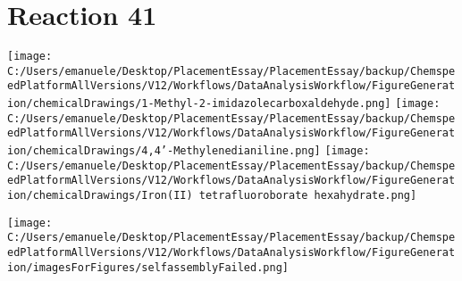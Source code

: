 \documentclass{article}%
\begin{document}
\section*{Reaction 41}%
%
\begin{scheme}[H]%
\begin{minipage}{0.5\textwidth}%
\texttt{[image: C:/Users/emanuele/Desktop/PlacementEssay/PlacementEssay/backup/ChemspeedPlatformAllVersions/V12/Workflows/DataAnalysisWorkflow/FigureGeneration/chemicalDrawings/1-Methyl-2-imidazolecarboxaldehyde.png]}%
\texttt{[image: C:/Users/emanuele/Desktop/PlacementEssay/PlacementEssay/backup/ChemspeedPlatformAllVersions/V12/Workflows/DataAnalysisWorkflow/FigureGeneration/chemicalDrawings/4,4'-Methylenedianiline.png]}%
\texttt{[image: C:/Users/emanuele/Desktop/PlacementEssay/PlacementEssay/backup/ChemspeedPlatformAllVersions/V12/Workflows/DataAnalysisWorkflow/FigureGeneration/chemicalDrawings/Iron(II) tetrafluoroborate hexahydrate.png]}%
\end{minipage}%
\begin{minipage}{0.5\textwidth}%
\begin{center}%
\texttt{[image: C:/Users/emanuele/Desktop/PlacementEssay/PlacementEssay/backup/ChemspeedPlatformAllVersions/V12/Workflows/DataAnalysisWorkflow/FigureGeneration/imagesForFigures/selfassemblyFailed.png]}%
\end{center}%
\end{minipage}%
\caption{Self-assembly of components 12, 17, with Iron(II) in a 3.0:1.5:1.0 molar ratio in CH$_3$CN at 60\textdegree C for 40h. These are the reagents (starting materials) for reaction 41.}%
\end{scheme}%
\end{document}
